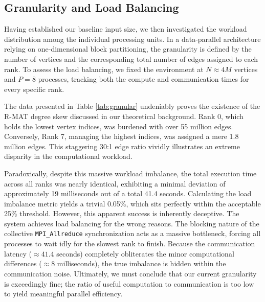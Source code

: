 \subsection{Granularity and Load Balancing}
Having established our baseline input size, we then investigated the workload distribution among the individual processing units. In a data-parallel architecture relying on one-dimensional block partitioning, the granularity is defined by the number of vertices and the corresponding total number of edges assigned to each rank. To assess the load balancing, we fixed the environment at $N \approx 4M$ vertices and $P=8$ processes, tracking both the compute and communication times for every specific rank.

The data presented in Table \ref{tab:granular} undeniably proves the existence of the R-MAT degree skew discussed in our theoretical background. Rank 0, which holds the lowest vertex indices, was burdened with over 55 million edges. Conversely, Rank 7, managing the highest indices, was assigned a mere 1.8 million edges. This staggering 30:1 edge ratio vividly illustrates an extreme disparity in the computational workload.

Paradoxically, despite this massive workload imbalance, the total execution time across all ranks was nearly identical, exhibiting a minimal deviation of approximately 19 milliseconds out of a total 41.4 seconds. Calculating the load imbalance metric yields a trivial 0.05\%, which sits perfectly within the acceptable 25\% threshold. However, this apparent success is inherently deceptive. The system achieves load balancing for the wrong reasons. The blocking nature of the collective \texttt{MPI\_Allreduce} synchronization acts as a massive bottleneck, forcing all processes to wait idly for the slowest rank to finish. Because the communication latency ($\approx 41.4$ seconds) completely obliterates the minor computational differences ($\approx 8$ milliseconds), the true imbalance is hidden within the communication noise. Ultimately, we must conclude that our current granularity is exceedingly fine; the ratio of useful computation to communication is too low to yield meaningful parallel efficiency.


